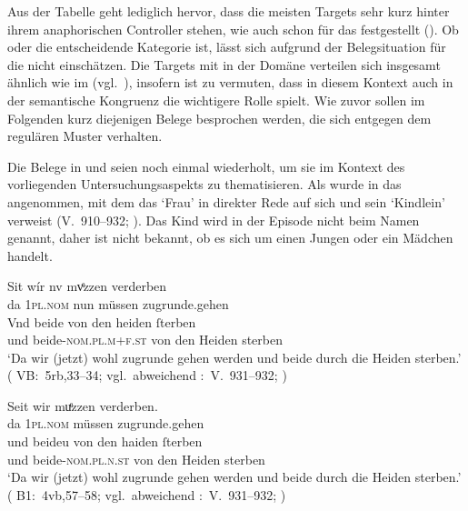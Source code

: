 Aus der Tabelle geht lediglich hervor, dass die meisten Targets sehr kurz
hinter ihrem anaphorischen Controller stehen, wie auch schon für das
\CAO{} festgestellt (). Ob  oder
 die entscheidende Kategorie ist, lässt sich aufgrund der
Belegsituation für die   nicht einschätzen.
Die Targets mit  in der Domäne  verteilen sich insgesamt ähnlich wie im
\CAO{} (vgl.~), insofern ist zu vermuten, dass in diesem
Kontext auch in der \KC{} semantische Kongruenz die
wichtigere Rolle spielt. Wie zuvor sollen im Folgenden kurz diejenigen Belege
besprochen werden, die sich entgegen dem regulären Muster verhalten.

Die Belege in  und  seien noch einmal
wiederholt, um sie im Kontext des vorliegenden Unter\-suchungsaspekts zu
thematisieren. Als  wurde in  das
  angenommen, mit dem das  `Frau' in
direkter Rede auf sich und sein  `Kindlein' verweist
(V.~910--932; \cite[98]{schroeder1895}). Das Kind wird in der Episode nicht
beim Namen genannt, daher ist nicht bekannt, ob es sich um einen Jungen oder
ein Mädchen handelt.

\begin{exe}
\ex \label{ex:wipkindelin2}
	\begin{xlist}
	\ex \label{ex:wipkindelin2_1}
		\gll Sit wír nv mvͤzzen verderben \\
			da \textsc{1pl\tsub{\SF/\SX}.nom} nun müssen zugrunde.gehen \\
	\sn \gll Vnd beide von den heiden ſterben \\
			und beide-\textsc{nom.pl.m+f\tsub{\SF/\SX}.st} von den Heiden
				sterben \\
		\trans `Da wir (jetzt) wohl zugrunde gehen werden und beide durch die Heiden sterben.'
			(%
				VB:~5rb,33--34; vgl.~abweichend
				\KC:~V.~931--932;
				\cite[98]{schroeder1895}%
			)
		
	\ex \label{ex:wipkindelin2_2}
		\gll Seit wir muͤzzen verderben. \\
			da \textsc{1pl\tsub{\SF/\SX}.nom} müssen zugrunde.gehen \\
	\sn \gll und beideu von den haiden ſterben \\
			und beide-\textsc{nom.pl.n\tsub{\SF/\SX}.st} von den Heiden
				sterben \\
		\trans `Da wir (jetzt) wohl zugrunde gehen werden und beide durch die Heiden sterben.'
			(%
				B1:~4vb,57--58; vgl.~abweichend
				\KC:~V.~931--932;
				\cite[98]{schroeder1895}%
			)
	\end{xlist}%
\end{exe}

